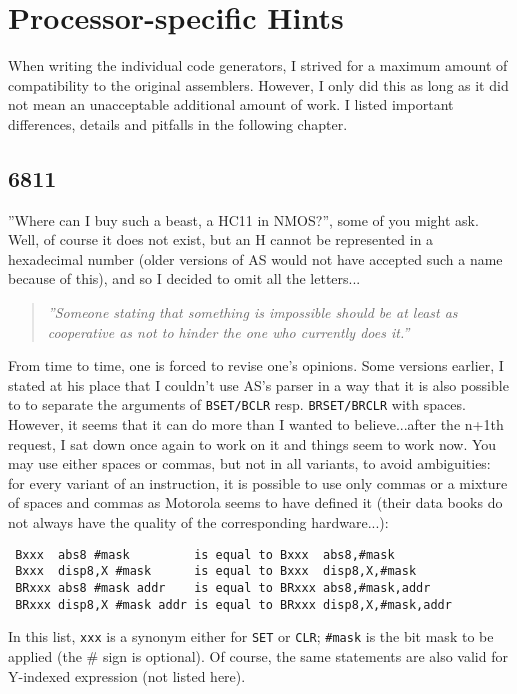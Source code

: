 \documentclass[12pt,twoside]{report}
\newcommand{\tty}[1]{{\tt #1}}
\begin{document}

\cleardoublepage
\chapter{Processor-specific Hints}

When writing the individual code generators, I strived for a maximum
amount of compatibility to the original assemblers.  However, I only did this
as long as it did not mean an unacceptable additional amount of work.
I listed important differences, details and pitfalls in the following
chapter.


\section{6811}

''Where can I buy such a beast, a HC11 in NMOS?'', some of you might
ask.  Well, of course it does not exist, but an H cannot be
represented in a hexadecimal number (older versions of AS would not
have accepted such a name because of this), and so I decided to omit
all the letters...
\par
\begin{quote}{\it
''Someone stating that something is impossible should be at least as
 cooperative as not to hinder the one who currently does it.''
}\end{quote}
From time to time, one is forced to revise one's opinions.  Some versions
earlier, I stated at his place that I couldn't use AS's parser in a way
that it is also possible to to separate the arguments of \tty{BSET/BCLR}
resp. \tty{BRSET/BRCLR} with spaces.  However, it seems that it can do
more than I wanted to believe...after the n+1th request, I sat down once
again to work on it and things seem to work now.  You may use either
spaces or commas, but not in all variants, to avoid ambiguities: for
every variant of an instruction, it is possible to use only commas or a
mixture of spaces and commas as Motorola seems to have defined it (their
data books do not always have the quality of the corresponding
hardware...):
\begin{verbatim}
 Bxxx  abs8 #mask         is equal to Bxxx  abs8,#mask
 Bxxx  disp8,X #mask      is equal to Bxxx  disp8,X,#mask
 BRxxx abs8 #mask addr    is equal to BRxxx abs8,#mask,addr
 BRxxx disp8,X #mask addr is equal to BRxxx disp8,X,#mask,addr
\end{verbatim}
In this list, \tty{xxx} is a synonym either for \tty{SET} or \tty{CLR};
\tty{\#mask} is the bit mask to be applied (the \# sign is optional).  Of
course, the same statements are also valid for Y-indexed expression (not
listed here).
\end{document}
